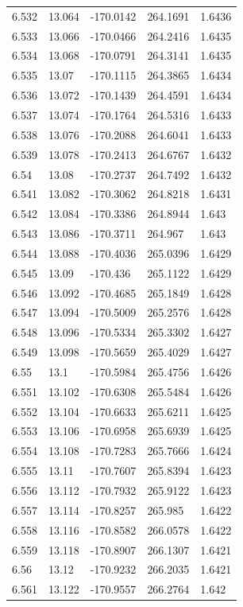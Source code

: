 \begin{tabular}{lllll}
6.532 & 13.064 & -170.0142 & 264.1691 & 1.6436 \\
6.533 & 13.066 & -170.0466 & 264.2416 & 1.6435 \\
6.534 & 13.068 & -170.0791 & 264.3141 & 1.6435 \\
6.535 & 13.07 & -170.1115 & 264.3865 & 1.6434 \\
6.536 & 13.072 & -170.1439 & 264.4591 & 1.6434 \\
6.537 & 13.074 & -170.1764 & 264.5316 & 1.6433 \\
6.538 & 13.076 & -170.2088 & 264.6041 & 1.6433 \\
6.539 & 13.078 & -170.2413 & 264.6767 & 1.6432 \\
6.54 & 13.08 & -170.2737 & 264.7492 & 1.6432 \\
6.541 & 13.082 & -170.3062 & 264.8218 & 1.6431 \\
6.542 & 13.084 & -170.3386 & 264.8944 & 1.643 \\
6.543 & 13.086 & -170.3711 & 264.967 & 1.643 \\
6.544 & 13.088 & -170.4036 & 265.0396 & 1.6429 \\
6.545 & 13.09 & -170.436 & 265.1122 & 1.6429 \\
6.546 & 13.092 & -170.4685 & 265.1849 & 1.6428 \\
6.547 & 13.094 & -170.5009 & 265.2576 & 1.6428 \\
6.548 & 13.096 & -170.5334 & 265.3302 & 1.6427 \\
6.549 & 13.098 & -170.5659 & 265.4029 & 1.6427 \\
6.55 & 13.1 & -170.5984 & 265.4756 & 1.6426 \\
6.551 & 13.102 & -170.6308 & 265.5484 & 1.6426 \\
6.552 & 13.104 & -170.6633 & 265.6211 & 1.6425 \\
6.553 & 13.106 & -170.6958 & 265.6939 & 1.6425 \\
6.554 & 13.108 & -170.7283 & 265.7666 & 1.6424 \\
6.555 & 13.11 & -170.7607 & 265.8394 & 1.6423 \\
6.556 & 13.112 & -170.7932 & 265.9122 & 1.6423 \\
6.557 & 13.114 & -170.8257 & 265.985 & 1.6422 \\
6.558 & 13.116 & -170.8582 & 266.0578 & 1.6422 \\
6.559 & 13.118 & -170.8907 & 266.1307 & 1.6421 \\
6.56 & 13.12 & -170.9232 & 266.2035 & 1.6421 \\
6.561 & 13.122 & -170.9557 & 266.2764 & 1.642 \\

\end{tabular}
